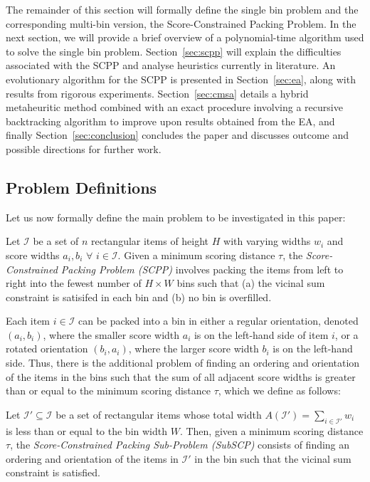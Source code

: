 \documentclass[authoryear]{elsarticle}
\begin{document}
\noindent The remainder of this section will formally define the single bin problem and the corresponding multi-bin version, the Score-Constrained Packing Problem. In the next section, we will provide a brief overview of a polynomial-time algorithm used to solve the single bin problem. Section~\ref{sec:scpp} will explain the difficulties associated with the SCPP and analyse heuristics currently in literature. An evolutionary algorithm for the SCPP is presented in Section~\ref{sec:ea}, along with results from rigorous experiments. Section~\ref{sec:cmsa} details a hybrid metaheuritic method combined with an exact procedure involving a recursive backtracking algorithm to improve upon results obtained from the EA, and finally Section~\ref{sec:conclusion} concludes the paper and discusses outcome and possible directions for further work.

\subsection{Problem Definitions}
\label{sub:intro}

\noindent Let us now formally define the main problem to be investigated in this paper:

\begin{definition}
	Let $\mathcal{I}$ be a set of $n$ rectangular items of height $H$ with varying widths $w_i$ and score widths $a_i, b_i$ $\forall$ $i \in \mathcal{I}$. Given a minimum scoring distance $\tau$, the \emph{Score-Constrained Packing Problem (SCPP)} involves packing the items from left to right into the fewest number of $H \times W$ bins such that (a) the vicinal sum constraint is satisifed in each bin and (b) no bin is overfilled.
	\label{defn:scpp}
\end{definition}	

\noindent Each item $i \in \mathcal{I}$ can be packed into a bin in either a regular orientation, denoted $(a_i, b_i)$, where the smaller score width $a_i$ is on the left-hand side of item $i$, or a rotated orientation $(b_i, a_i)$, where the larger score width $b_i$ is on the left-hand side. Thus, there is the additional problem of finding an ordering and orientation of the items in the bins such that the sum of all adjacent score widths is greater than or equal to the minimum scoring distance $\tau$, which we define as follows:

\begin{definition}
	Let $\mathcal{I}' \subseteq \mathcal{I}$ be a set of rectangular items whose total width $A(\mathcal{I}') = \sum_{i \in \mathcal{I}'} w_i$ is less than or equal to the bin width $W$. Then, given a minimum scoring distance $\tau$, the \emph{Score-Constrained Packing Sub-Problem (SubSCP)} consists of finding an ordering and orientation of the items in $\mathcal{I}'$ in the bin such that the vicinal sum constraint is satisfied.
	\label{defn:subscp}
\end{definition}
\end{document}
